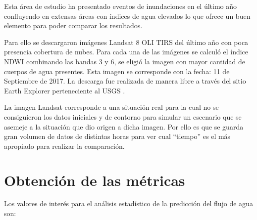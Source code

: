 \documentclass[10pt,a4paper, twoside]{report}
\begin{document}
Esta área de estudio ha presentado eventos de inundaciones en el último año confluyendo en extensas áreas con índices de agua elevados lo que ofrece un buen elemento para poder comparar los resultados.

Para ello se descargaron imágenes Landsat 8 OLI TIRS del último año con poca presencia cobertura de nubes. Para cada una de las imágenes se calculó el índice NDWI combinando las bandas 3 y 6, se eligió la imagen con mayor cantidad de cuerpos de agua presentes. Esta imagen se corresponde con la fecha: 11 de Septiembre de 2017. La descarga fue realizada de manera libre a través del sitio Earth Explorer perteneciente al USGS \cite{earthExplorer}.

La imagen Landsat corresponde a una situación real para la cual no se consiguieron los datos iniciales y de contorno para simular un escenario que se asemeje a la situación que dio origen a dicha imagen. Por ello es que se guarda gran volumen de datos de distintas horas para ver cual "`tiempo"' es el más apropiado para realizar la comparación.

\section{Obtención de las métricas}
\label{defmetricas}



Los valores de interés para el análisis estadístico de la predicción del flujo de agua son:
\end{document}
